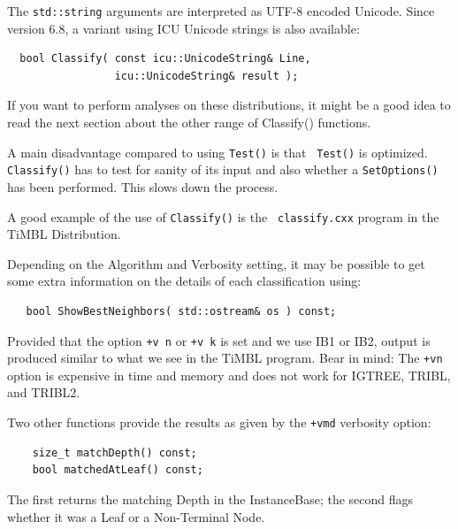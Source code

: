 \documentclass{report}
\begin{document}
The {\tt std::string} arguments are interpreted as UTF-8 encoded
Unicode. Since version 6.8, a variant using ICU Unicode strings is
also available:

\begin{footnotesize}
\begin{verbatim}
  bool Classify( const icu::UnicodeString& Line,
                 icu::UnicodeString& result );
\end{verbatim}
\end{footnotesize}

If you want to perform analyses on these distributions, it might be a
good idea to read the next section about the other range of Classify()
functions.

A main disadvantage compared to using {\tt Test()} is that {\tt
  Test()} is optimized.  {\tt Classify()} has to test for sanity of
its input and also whether a {\tt SetOptions()} has been
performed. This slows down the process.

A good example of the use of {\tt Classify()} is the {\tt
 classify.cxx} program in the TiMBL Distribution.

Depending on the Algorithm and Verbosity setting, it may be possible
to get some extra information on the details of each classification
using:

\begin{footnotesize}
\begin{verbatim}
   bool ShowBestNeighbors( std::ostream& os ) const;
\end{verbatim}
\end{footnotesize}

Provided that the option {\tt +v n} or {\tt +v k} is set and we use
IB1 or IB2, output is produced similar to what we see in the TiMBL
program.  Bear in mind: The {\tt +vn} option is expensive in time
and memory and does not work for IGTREE, TRIBL, and TRIBL2.

Two other functions provide the results as given by the {\tt +vmd} verbosity
option:

\begin{footnotesize}
\begin{verbatim}
    size_t matchDepth() const;
    bool matchedAtLeaf() const;
\end{verbatim}
\end{footnotesize}

The first returns the matching Depth in the InstanceBase; the second
flags whether it was a Leaf or a Non-Terminal Node.
\end{document}
